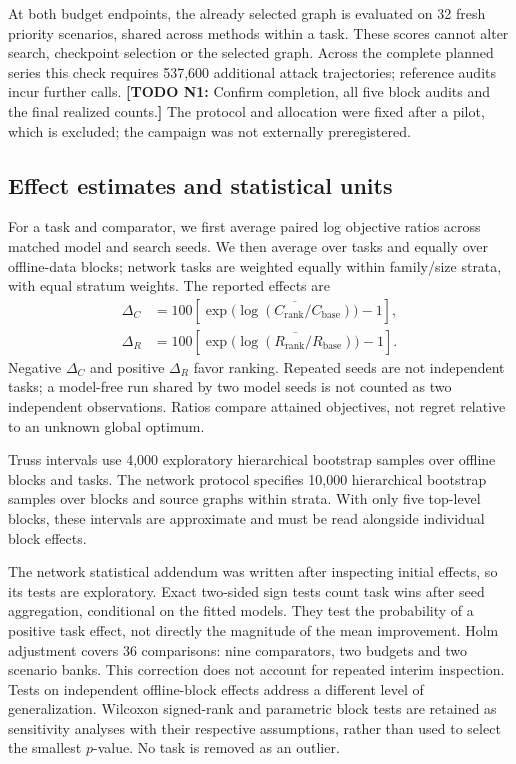 \documentclass[11pt,a4paper]{article}
\newcommand{\todo}[2]{\textcolor{red!65!black}{\textbf{[TODO #1:} #2\textbf{]}}}
\begin{document}
At both budget endpoints, the already selected graph is evaluated on 32 fresh priority scenarios, shared across methods within a task. These scores cannot alter search, checkpoint selection or the selected graph. Across the complete planned series this check requires 537,600 additional attack trajectories; reference audits incur further calls. \todo{N1}{Confirm completion, all five block audits and the final realized counts.} The protocol and allocation were fixed after a pilot, which is excluded; the campaign was not externally preregistered.

\subsection{Effect estimates and statistical units}
For a task and comparator, we first average paired log objective ratios across matched model and search seeds. We then average over tasks and equally over offline-data blocks; network tasks are weighted equally within family/size strata, with equal stratum weights. The reported effects are
\begin{align}
\Delta_C &=100\left[\exp\big(\overline{\log(C_{\mathrm{rank}}/C_{\mathrm{base}})}\big)-1\right],\\
\Delta_R &=100\left[\exp\big(\overline{\log(R_{\mathrm{rank}}/R_{\mathrm{base}})}\big)-1\right].
\end{align}
Negative $\Delta_C$ and positive $\Delta_R$ favor ranking. Repeated seeds are not independent tasks; a model-free run shared by two model seeds is not counted as two independent observations. Ratios compare attained objectives, not regret relative to an unknown global optimum.

Truss intervals use 4,000 exploratory hierarchical bootstrap samples over offline blocks and tasks. The network protocol specifies 10,000 hierarchical bootstrap samples over blocks and source graphs within strata. With only five top-level blocks, these intervals are approximate and must be read alongside individual block effects.

The network statistical addendum was written after inspecting initial effects, so its tests are exploratory. Exact two-sided sign tests count task wins after seed aggregation, conditional on the fitted models. They test the probability of a positive task effect, not directly the magnitude of the mean improvement. Holm adjustment covers 36 comparisons: nine comparators, two budgets and two scenario banks. This correction does not account for repeated interim inspection. Tests on independent offline-block effects address a different level of generalization. Wilcoxon signed-rank and parametric block tests are retained as sensitivity analyses with their respective assumptions, rather than used to select the smallest $p$-value. No task is removed as an outlier.
\end{document}
